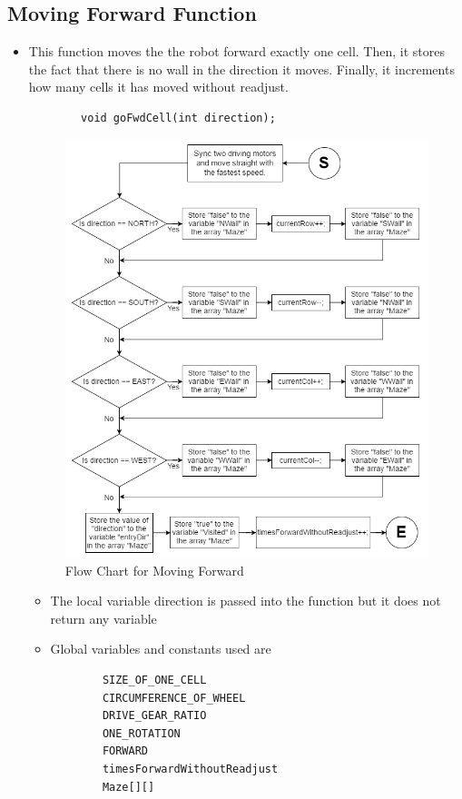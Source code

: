 \documentclass[11pt]{article}
\begin{document}
\subsection{Moving Forward Function}
\begin{itemize}
\item This function moves the the robot forward exactly one cell. Then, it stores the fact that there is no wall in the direction it moves. Finally, it increments how many cells it has moved without readjust. 
	\begin{verbatim}
		void goFwdCell(int direction);
	\end{verbatim}
\begin{figure}[htp]
\centering
\includegraphics[scale=0.52]{images/Software_Flowchart/Moving_Forward.png}
\caption{Flow Chart for Moving Forward}
\label{}
\end{figure}	
	\begin{itemize}
	\item The local variable direction is passed into the function but it does not return any variable
	\item Global variables and constants used are
	\begin{verbatim}
		SIZE_OF_ONE_CELL
		CIRCUMFERENCE_OF_WHEEL
		DRIVE_GEAR_RATIO
		ONE_ROTATION
		FORWARD
		timesForwardWithoutReadjust
		Maze[][]
	\end{verbatim}
	\end{itemize}
\end{itemize}
\newpage
\end{document}
